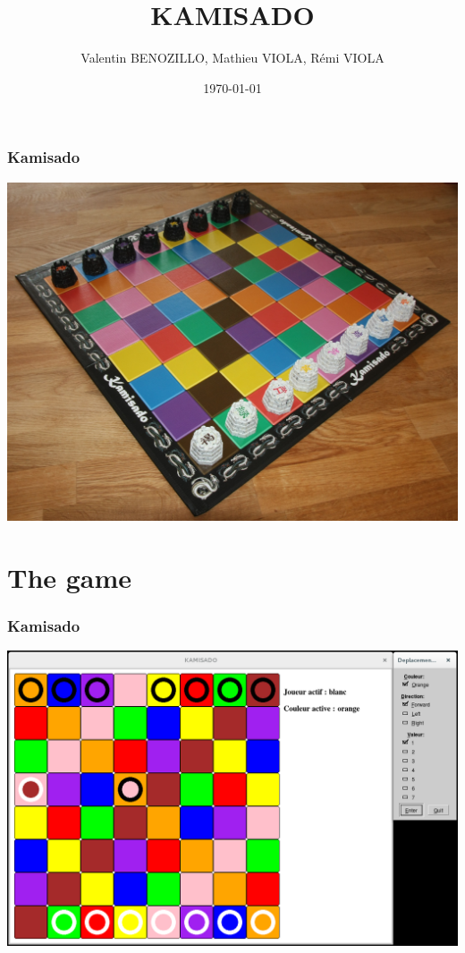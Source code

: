 \documentclass[a4paper, 11pt]{beamer}
\title{KAMISADO}
\author{Valentin BENOZILLO, Mathieu VIOLA, Rémi VIOLA}
\date{\today}
\begin{document}
\begin{frame}
\titlepage
\end{frame}

\begin{frame}
\tableofcontents
\end{frame}

\begin{frame}
\frametitle{Kamisado}
\begin{center}
\includegraphics[scale = 0.07]{kamisado.jpeg}
\end{center}
\end{frame}

\section{The game}
\begin{frame}
\frametitle{Kamisado}
\begin{center}
\includegraphics[scale = 0.25]{kamisado.png}
\end{center}
\end{frame}
\end{document}
